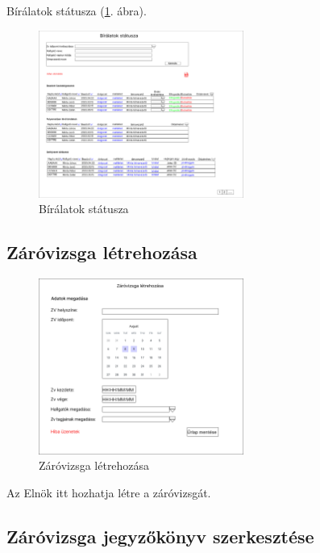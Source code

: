\documentclass[a4paper,12pt]{article}
\begin{document}
Bírálatok státusza (\ref{fig:Report_Status}. ábra).

\begin{figure}[h!]
	\centering
	\includegraphics[width=0.6\textwidth]{images/Web_pages/Report_Status.jpg}
	\caption{Bírálatok státusza}
	\label{fig:Report_Status}
\end{figure}

\subsection{Záróvizsga létrehozása}

\begin{figure}[h!]
	\centering
	\includegraphics[width=0.6\textwidth]{images/Web_pages/ZV_Create.jpg}
	\caption{Záróvizsga létrehozása}
	\label{fig:ZV_Create}
\end{figure}

Az Elnök itt hozhatja létre a záróvizsgát.

\subsection{Záróvizsga jegyzőkönyv szerkesztése}

\end{document}
